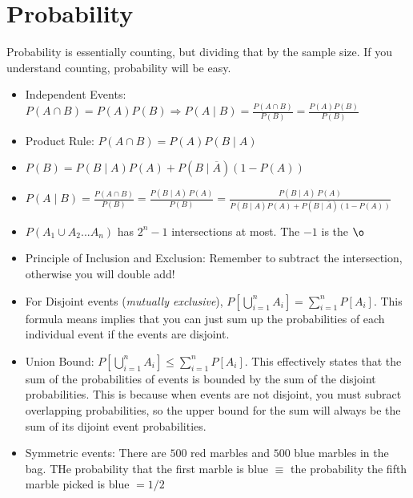 \documentclass[a4paper]{article}
\begin{document}
\section{Probability}
Probability is essentially counting, but dividing that by the sample size. If you understand counting, probability will be easy.
\begin{itemize}
    \item Independent Events: $P(A \cap B) = P(A)P(B) \Rightarrow P(A \mid B) = \frac{P(A \cap B)}{P(B)} = \frac{P(A)P(B)}{P(B)} $
    \item Product Rule: $P(A \cap B) = P(A)P(B \mid A)$
    \item $ P(B) = P(B \mid A) P(A) + P(B \mid \overline A)(1-P(A))$
    \item $ P(A \mid B) = \frac{P(A \cap B)}{P(B)} = \frac{P(B \mid A) \, P(A)}{P(B)} = \frac{P(B \mid A) \, P(A)}{P(B \mid A) P(A) + P(B \mid \overline A)(1-P(A))} $
    \item $P(A_1 \cup A_2 ...A_n)$ has $2^n - 1$ intersections at most. The $-1$ is the $\o$
    \item Principle of Inclusion and Exclusion: Remember to subtract the intersection, otherwise you will double add! 
    \item For Disjoint events (\textit{mutually exclusive}), $P[\bigcup_{i=1}^n A_i] = \sum_{i=1}^n P[A_i]$. This formula means implies that you can just sum up the probabilities of each individual event if the events are disjoint.
    \item Union Bound: $P[\bigcup_{i=1}^n A_i] \leq \sum_{i=1}^n P[A_i]$. This effectively states that the sum of the probabilities of events is bounded by the sum of the disjoint probabilities. This is because when events are not disjoint, you must subract overlapping probabilities, so the upper bound for the sum will always be the sum of its dijoint event probabilities. 
    \item Symmetric events: There are $500$ red marbles and $500$ blue marbles in the bag. THe probability that the first marble is blue $\equiv$ the probability the fifth marble picked is blue $= 1/2$

\end{itemize}
\end{document}

